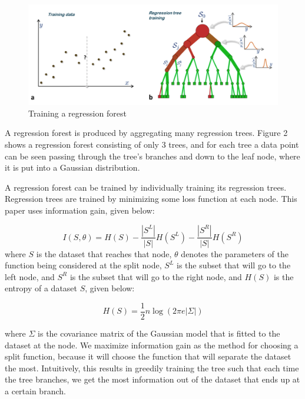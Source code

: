 \begin{figure}
\includegraphics[scale=0.45]{regressiontraining.png}
\caption{Training a regression forest}
\end{figure}

A regression forest is produced by aggregating many regression trees. Figure 2 shows a regression forest consisting of only 3 trees, and for each tree a data point can be seen passing through the tree's branches and down to the leaf node, where it is put into a Gaussian distribution.
  
A regression forest can be trained by individually training its regression trees. Regression trees are trained by minimizing some loss function at each node. This paper uses information gain, given below:

\begin{equation}
  I(S,\theta) = H(S) - \frac{|S^L|}{|S|} H(S^L) - \frac{|S^R|}{|S|} H(S^R)
\end{equation}
where $S$ is the dataset that reaches that node, $\theta$ denotes the parameters of the function being considered at the split node, $S^L$ is the subset that will go to the left node, and $S^R$ is the subset that will go to the right node, and $H(S)$ is the entropy of a dataset $S$, given below:

\begin{equation}
  H(S) = \frac{1}{2} n \log(2\pi e  |\Sigma|)
\end{equation}

where $\Sigma$ is the covariance matrix of the Gaussian model that is fitted to the dataset at the node. We maximize information gain as the method for choosing a split function, because it will choose the function that will separate the dataset the most. Intuitively, this results in greedily training the tree such that each time the tree branches, we get the most information out of the dataset that ends up at a certain branch.

